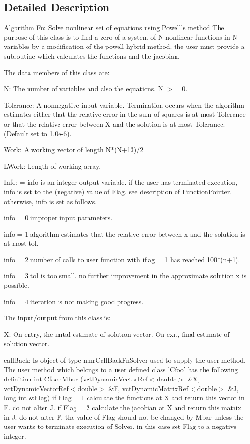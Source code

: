 \subsection{Detailed Description}
Algorithm Fn\-: Solve nonlinear set of equations using Powell's method The purpose of this class is to find a zero of a system of N nonlinear functions in N variables by a modification of the powell hybrid method. the user must provide a subroutine which calculates the functions and the jacobian.

The data members of this class are\-:


\begin{DoxyItemize}
\item N\-: The number of variables and also the equations. N $>$= 0.
\item Tolerance\-: A nonnegative input variable. Termination occurs when the algorithm estimates either that the relative error in the sum of squares is at most Tolerance or that the relative error between X and the solution is at most Tolerance. (Default set to 1.\-0e-\/6).
\item Work\-: A working vector of length N$\ast$(N+13)/2
\item L\-Work\-: Length of working array.
\item Info\-: = info is an integer output variable. if the user has terminated execution, info is set to the (negative) value of Flag. see description of Function\-Pointer. otherwise, info is set as follows.

info = 0 improper input parameters.

info = 1 algorithm estimates that the relative error between x and the solution is at most tol.

info = 2 number of calls to user function with iflag = 1 has reached 100$\ast$(n+1).

info = 3 tol is too small. no further improvement in the approximate solution x is possible.

info = 4 iteration is not making good progress.
\end{DoxyItemize}

The input/output from this class is\-:
\begin{DoxyItemize}
\item X\-: On entry, the inital estimate of solution vector. On exit, final estimate of solution vector.
\item call\-Back\-: Is object of type nmr\-Call\-Back\-Fn\-Solver used to supply the user method. The user method which belongs to a user defined class 'Cfoo' has the following definition int Cfoo\-::\-Mbar (\hyperlink{classvct_dynamic_vector_ref}{vct\-Dynamic\-Vector\-Ref$<$double$>$} \&X, \hyperlink{classvct_dynamic_vector_ref}{vct\-Dynamic\-Vector\-Ref$<$double$>$} \&F, \hyperlink{classvct_dynamic_matrix_ref}{vct\-Dynamic\-Matrix\-Ref$<$double$>$} \&J, long int \&Flag) if Flag = 1 calculate the functions at X and return this vector in F. do not alter J. if Flag = 2 calculate the jacobian at X and return this matrix in J. do not alter F. the value of Flag should not be changed by Mbar unless the user wants to terminate execution of Solver. in this case set Flag to a negative integer.
\end{DoxyItemize}

